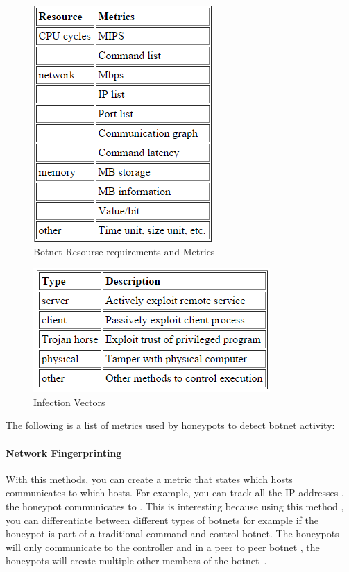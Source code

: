 \begin{figure}
\centering
\includegraphics[width=0.7\linewidth]{"images/1"}
\caption{Botnet Resourse requirements and Metrics}
\label{fig:1}
\end{figure}
\begin{figure}
\centering
\includegraphics[width=0.7\linewidth]{"images/2"}
\caption{Infection Vectors}
\label{fig:2}
\end{figure}

The following is a list of metrics used by honeypots to detect botnet activity:
\indent
\paragraph{Network Fingerprinting}
With this methods,  you can create a metric that states which hosts communicates to which hosts. For example, you can track all the IP addresses , the honeypot communicates to	. This is interesting because using this method , you can differentiate between different types of botnets for example if  the honeypot is part of a traditional command and control botnet. The honeypots will only communicate to the controller and  in a peer to peer botnet , the honeypots will create multiple other members of the botnet~\cite{GJ2007}.

